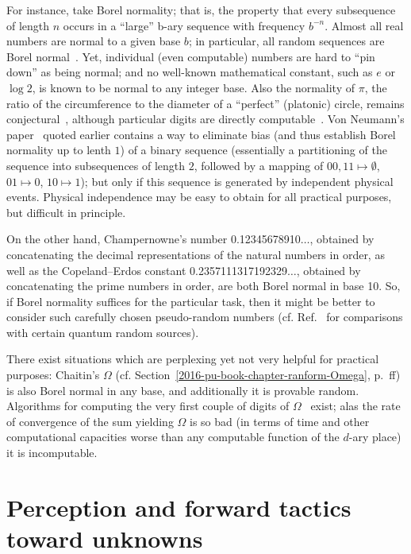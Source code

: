 For instance, take Borel normality;
that is, the property that every subsequence of length $n$ occurs in a ``large'' b-ary sequence with
frequency $b^{-n}$.
Almost all real numbers are normal to a given base $b$; in particular,
all random  sequences are Borel normal~\cite{DBLP:conf/dlt/Calude93}.
Yet, individual (even computable) numbers are hard to ``pin down''
as being  normal; and no well-known mathematical
constant, such as $e$ or $\log 2$, is known to be normal to any integer base.
Also the normality of $\pi$, the ratio of the circumference to the diameter of a ``perfect'' (platonic) circle,
remains conjectural~\cite{Bailey-pi-2012}, although particular digits are directly computable~\cite{bailey97}.
Von Neumann's paper~\cite{von-neumann1}  quoted earlier
contains a way to eliminate bias (and thus establish Borel normality up to lenth $1$) of a binary sequence
(essentially a partitioning of the sequence into subsequences of length $2$, followed by a mapping of
$00,11 \mapsto \emptyset$,
$01 \mapsto 0$,
$10 \mapsto 1$); but only if this  sequence is generated by independent physical events.
Physical independence may be easy to obtain for all practical purposes, but difficult in principle.

On the other hand, Champernowne's number
0.12345678910$\ldots$,
obtained by concatenating the decimal representations of the natural numbers in order, as well as
the Copeland--Erdos constant
0.2357111317192329$\ldots$,
obtained by concatenating the prime numbers in order, are both Borel normal in base 10.
So, if Borel normality suffices for the particular task,
then it might be better to consider such carefully chosen pseudo-random numbers
(cf. Ref.~\cite{PhysRevA.82.022102} for comparisons with certain quantum random sources).


There exist situations which are perplexing yet not very helpful for practical purposes:
Chaitin's $\Omega$
(cf. Section~\ref{2016-pu-book-chapter-ranform-Omega}, p.~\pageref{2016-pu-book-chapter-ranform-Omega}ff)
is also Borel normal in any base,
and additionally it is provable random.
Algorithms for computing the very first couple of digits of $\Omega$~\cite{2002-glimpseofran,calude-dinneen06} exist;
alas the rate of convergence of the sum yielding $\Omega$ is so bad
(in terms of time and other computational capacities worse than any computable function of the $d$-ary place) it is incomputable.

\section{Perception and forward tactics toward unknowns}

